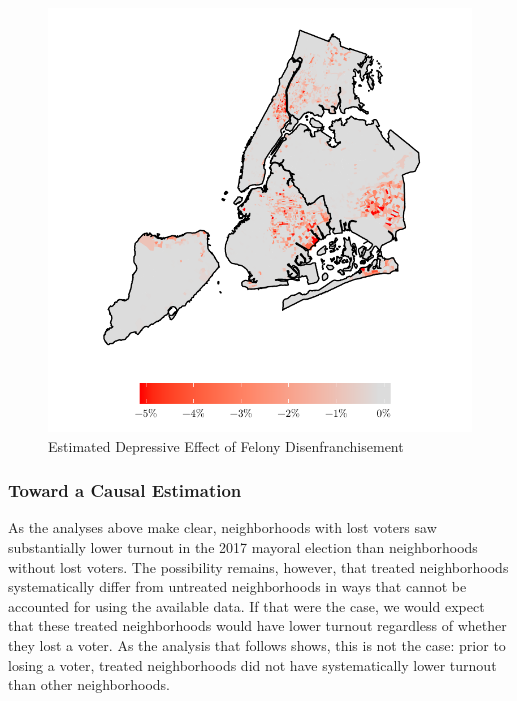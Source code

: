\documentclass[
  12pt,
]{article}
\begin{document}
\begin{figure}[H]

{\centering \includegraphics{felony_disenfranchisement_nys_files/figure-latex/postest-map-1} 

}

\caption{\label{fig:postest}Estimated Depressive Effect of Felony Disenfranchisement}\label{fig:postest-map}
\end{figure}

\hypertarget{toward-a-causal-estimation}{%
\subsubsection*{Toward a Causal Estimation}\label{toward-a-causal-estimation}}

As the analyses above make clear, neighborhoods with lost voters saw substantially lower turnout in the 2017 mayoral election than neighborhoods without lost voters. The possibility remains, however, that treated neighborhoods systematically differ from untreated neighborhoods in ways that cannot be accounted for using the available data. If that were the case, we would expect that these treated neighborhoods would have lower turnout regardless of whether they lost a voter. As the analysis that follows shows, this is not the case: prior to losing a voter, treated neighborhoods did not have systematically lower turnout than other neighborhoods.
\end{document}
